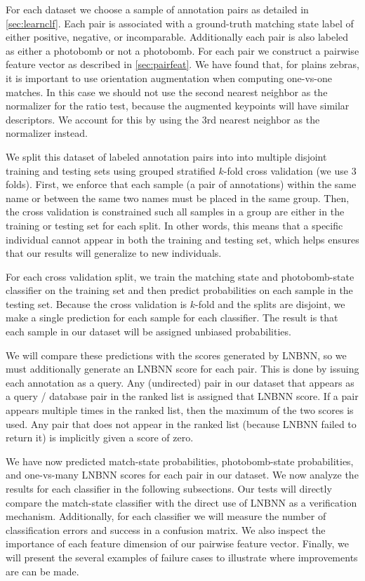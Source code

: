     For each dataset we choose a sample of annotation pairs as detailed in \cref{sec:learnclf}. Each pair is
    associated with a ground-truth matching state label of either positive, negative, or incomparable. Additionally
    each pair is also labeled as either a photobomb or not a photobomb. For each pair we construct a pairwise
    feature vector as described in \cref{sec:pairfeat}. We have found that, for plains zebras, it is important to
    use orientation augmentation when computing one-vs-one matches. In this case we should not use the second
    nearest neighbor as the normalizer for the ratio test, because the augmented keypoints will have similar
    descriptors. We account for this by using the 3rd nearest neighbor as the normalizer instead.

    We split this dataset of labeled annotation pairs into into multiple disjoint training and testing sets using
    grouped stratified $k$-fold cross validation (we use $3$ folds). First, we enforce that each sample (a pair of
    annotations) within the same name or between the same two names must be placed in the same group. Then, the
    cross validation is constrained such all samples in a group are either in the training or testing set for each
    split. In other words, this means that a specific individual cannot appear in both the training and testing
    set, which helps ensures that our results will generalize to new individuals.

    For each cross validation split, we train the matching state and photobomb-state classifier on the training set
    and then predict probabilities on each sample in the testing set. Because the cross validation is $k$-fold and
    the splits are disjoint, we make a single prediction for each sample for each classifier. The result is that
    each sample in our dataset will be assigned unbiased probabilities.

    We will compare these predictions with the scores generated by LNBNN, so we must additionally generate an LNBNN
    score for each pair. This is done by issuing each annotation as a query. Any (undirected) pair in our dataset
    that appears as a query / database pair in the ranked list is assigned that LNBNN score. If a pair appears
    multiple times in the ranked list, then the maximum of the two scores is used. Any pair that does not appear in
    the ranked list (because LNBNN failed to return it) is implicitly given a score of zero.

    We have now predicted match-state probabilities, photobomb-state probabilities, and one-vs-many LNBNN scores
    for each pair in our dataset. We now analyze the results for each classifier in the following subsections. Our
    tests will directly compare the match-state classifier with the direct use of LNBNN as a verification
    mechanism. Additionally, for each classifier we will measure the number of classification errors and success in
    a confusion matrix. We also inspect the importance of each feature dimension of our pairwise feature vector.
    Finally, we will present the several examples of failure cases to illustrate where improvements are can be
    made.

